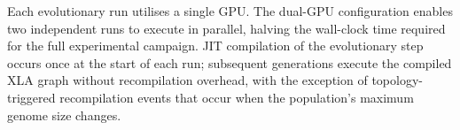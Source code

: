 \documentclass[12pt]{article}
\begin{document}
Each evolutionary run utilises a single GPU. The dual-GPU configuration enables two independent runs to execute in parallel, halving the wall-clock time required for the full experimental campaign. JIT compilation of the evolutionary step occurs once at the start of each run; subsequent generations execute the compiled XLA graph without recompilation overhead, with the exception of topology-triggered recompilation events that occur when the population's maximum genome size changes.






\end{document}
